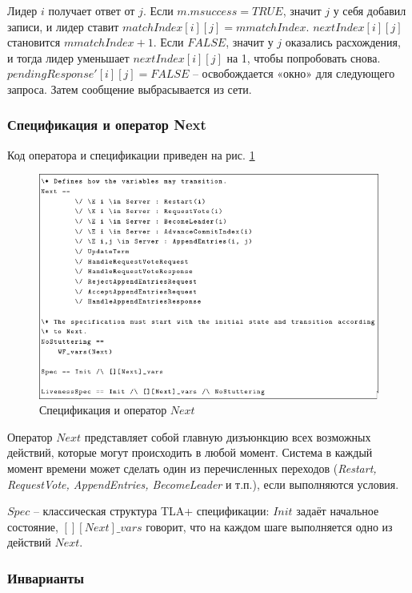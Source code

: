 Лидер $i$ получает ответ от $j$. Если $m.msuccess = TRUE$, значит $j$ у себя
добавил записи, и лидер ставит $matchIndex[i][j] = mmatchIndex$. $nextIndex[i][j]$
становится $mmatchIndex + 1$. Если $FALSE$, значит у $j$ оказались расхождения,
и тогда лидер уменьшает $nextIndex[i][j]$ на 1, чтобы попробовать снова.
$pendingResponse'[i][j] = FALSE$ – освобождается «окно» для следующего запроса.
Затем сообщение выбрасывается из сети.

\subsubsection*{Спецификация и оператор Next}

Код оператора и спецификации приведен на рис. \ref{fig:tla-07}

\begin{figure}
  \centering
  \includegraphics[scale=0.4]{inc/tla-07.png}
  \caption{Спецификация и оператор $Next$}
  \label{fig:tla-07}
\end{figure}

Оператор $Next$ представляет собой главную дизъюнкцию всех возможных действий,
которые могут происходить в любой момент. Система в каждый момент времени может
сделать один из перечисленных переходов (\textit{Restart, RequestVote, AppendEntries,
BecomeLeader} и т.п.), если выполняются условия.

$Spec$ – классическая структура TLA+ спецификации: $Init$ задаёт начальное
состояние, $[][Next]\_vars$ говорит, что на каждом шаге выполняется одно из
действий $Next$.

\subsubsection*{Инварианты}

